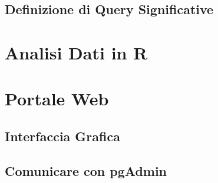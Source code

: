 \documentclass{article}
\begin{document}
\subsection{Definizione di Query Significative}




\clearpage
\section{Analisi Dati in R}




\clearpage
\section{Portale Web}
\subsection{Interfaccia Grafica}
\subsection{Comunicare con pgAdmin}
\end{document}

